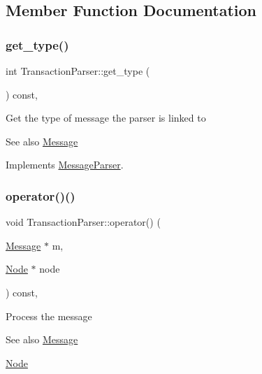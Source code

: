 \subsection{Member Function Documentation}
\mbox{\label{classTransactionParser_a34bed6ceb924ae378b3b2e89a29ae230}} 
\subsubsection{\texorpdfstring{get\+\_\+type()}{get\_type()}}
{\footnotesize\ttfamily int Transaction\+Parser\+::get\+\_\+type (\begin{DoxyParamCaption}{ }\end{DoxyParamCaption}) const\hspace{0.3cm}{\ttfamily [final]}, {\ttfamily [virtual]}}

Get the type of message the parser is linked to \begin{DoxySeeAlso}{See also}
\mbox{\hyperlink{classMessage}{Message}} 
\end{DoxySeeAlso}


Implements \mbox{\hyperlink{classMessageParser_aa7c495d7b28a394e5752ca25ffff69d8}{Message\+Parser}}.

\mbox{\label{classTransactionParser_addb18b5cb23a07ef6a46c4d89a1c9f23}} 
\subsubsection{\texorpdfstring{operator()()}{operator()()}}
{\footnotesize\ttfamily void Transaction\+Parser\+::operator() (\begin{DoxyParamCaption}\item[{\mbox{\hyperlink{classMessage}{Message}} $\ast$}]{m,  }\item[{\mbox{\hyperlink{classNode}{Node}} $\ast$}]{node }\end{DoxyParamCaption}) const\hspace{0.3cm}{\ttfamily [final]}, {\ttfamily [virtual]}}

Process the message \begin{DoxySeeAlso}{See also}
\mbox{\hyperlink{classMessage}{Message}} 

\mbox{\hyperlink{classNode}{Node}}
\end{DoxySeeAlso}


